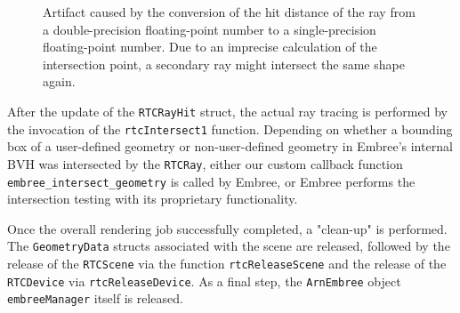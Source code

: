 \begin{figure}[!tbp]
	\centering
	\hfil
	\caption{Artifact caused by the conversion of the hit distance of the ray from a double-precision floating-point number to a single-precision floating-point number. Due to an imprecise calculation of the intersection point, a secondary ray might intersect the same shape again.}
	\label{fig:offset}
\end{figure}

After the update of the \texttt{RTCRayHit} struct, the actual ray tracing is performed by the invocation of the \texttt{rtcIntersect1} function. Depending on whether a bounding box of a user-defined geometry or non-user-defined geometry in Embree's internal BVH was intersected by the \texttt{RTCRay}, either our custom callback function \texttt{embree\_intersect\_geometry} is called by Embree, or Embree performs the intersection testing with its proprietary functionality.

Once the overall rendering job successfully completed, a "clean-up" is performed. The \texttt{GeometryData} structs associated with the scene are released, followed by the release of the \texttt{RTCScene} via the function \texttt{rtcReleaseScene} and the release of the \texttt{RTCDevice} via \texttt{rtcReleaseDevice}. As a final step, the \texttt{ArnEmbree} object \texttt{embreeManager} itself is released.


